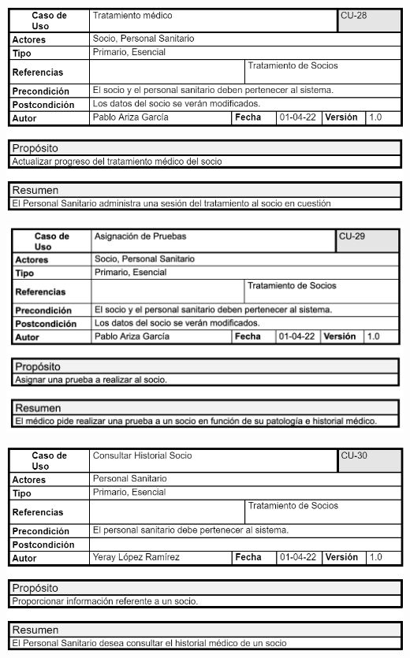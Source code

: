 \documentclass[12pt, spanish]{article}
\begin{document}
\begin{centering}\includegraphics[scale = 0.62]{casos_de_uso/28.png}\\[1.0 cm]\end{centering}
\begin{centering}\includegraphics[scale = 0.70]{casos_de_uso/29.png}\\[1.0 cm]\end{centering}
\begin{centering}\includegraphics[scale = 0.62]{casos_de_uso/30.png}\\[1.0 cm]\end{centering}
\end{document}
